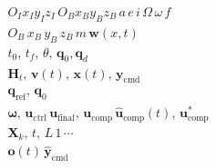 \documentclass[
    Language        = chinese,
    Degree          = graduate,
    Type            = design,
    Period          = final,
    GradLevel       = master
]{zjuthesis}
\begin{document}
\thispagestyle{empty}
%
\[
    \begin{aligned}
        O_I x_I y_I z_I \, O_B x_B y_B z_B \, a \, e \, i \, \Omega \, \omega \, f \\
    O_B \, x_B \, y_B \, z_B \, m \, \bm{w}(x, t) \\
    t_0, \, t_f, \, \theta, \, \bm{q}_0, \bm{q}_d \\
    \bm{H}_t, \, \bm{v}(t), \, \bm{x}(t), \, \bm{y}_\mathrm{cmd} \\
    \bm{q}_\mathrm{ref}, \, \bm{q}_0 \\
    \bm{\omega}, \, \bm{u}_{\mathrm{ctrl}} \, \bm{u}_{\mathrm{final}}, \, \bm{u}_{\mathrm{comp}} \, \hat{\bm{u}}_{\mathrm{comp}}(t), \, \bm{u}_{\mathrm{comp}}^* \\
    \bm{X}_k, \, t, \, L \, 1 \, \cdots \\
    \bm{o}(t) \, \hat{\bm{y}}_{\mathrm{cmd}}
    \end{aligned}
\]
\end{document}
